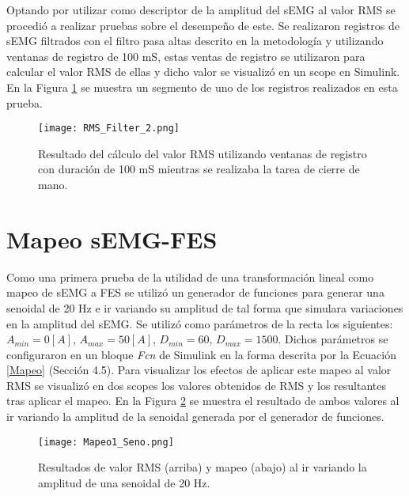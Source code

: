 Optando por utilizar como descriptor de la amplitud del sEMG al valor RMS se procedió a realizar pruebas sobre el desempeño de este. Se realizaron registros de sEMG filtrados con el filtro pasa altas descrito en la metodología y utilizando ventanas de registro de 100 mS, estas ventas de registro se utilizaron para calcular el valor RMS de ellas y dicho valor se visualizó en un scope en Simulink. En la Figura \ref{Figura: RMS_Filter} se muestra un segmento de uno de los registros realizados en esta prueba.

\begin{figure}[htbp]
	\centering
	\texttt{[image: RMS\_Filter\_2.png]}
	\caption{Resultado del cálculo del valor RMS utilizando ventanas de registro con duración de 100 mS mientras se realizaba la tarea de cierre de mano.}
	\label{Figura: RMS_Filter}
\end{figure}

\newpage
\section{Mapeo sEMG-FES}
Como una primera prueba de la utilidad de una transformación lineal como mapeo de sEMG a FES se utilizó un generador de funciones para generar una senoidal de  20 Hz e ir variando su amplitud de tal forma que simulara variaciones en la amplitud del sEMG. Se utilizó como parámetros de la recta los siguientes: $A_{min}=0[A]$, $A_{max}=50[A]$, $D_{min}=60$, $D_{max}=1500$. Dichos parámetros se configuraron en un bloque \emph{Fcn} de Simulink en la forma descrita por la Ecuación \ref{Mapeo} (Sección 4.5). Para visualizar los efectos de aplicar este mapeo al valor RMS se visualizó en dos scopes los valores obtenidos de RMS y los resultantes tras aplicar el mapeo. En la Figura \ref{Figura: Map1_Sen} se muestra el resultado de ambos valores al ir variando la amplitud de la senoidal generada por el generador de funciones.

\begin{figure}
	\centering
	\texttt{[image: Mapeo1\_Seno.png]}
	\caption{Resultados de valor RMS (arriba) y mapeo (abajo) al ir variando la amplitud de una senoidal de 20 Hz.}
	\label{Figura: Map1_Sen}
\end{figure}
